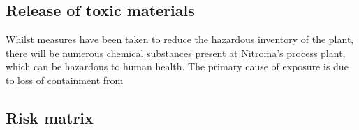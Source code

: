 \subsection{Release of toxic materials}

Whilst measures have been taken to reduce the hazardous inventory of the plant, there will be numerous chemical substances present at Nitroma's process plant, which can be hazardous to human health. The primary cause of exposure is due to loss of containment from 







\subsection{Risk matrix}

